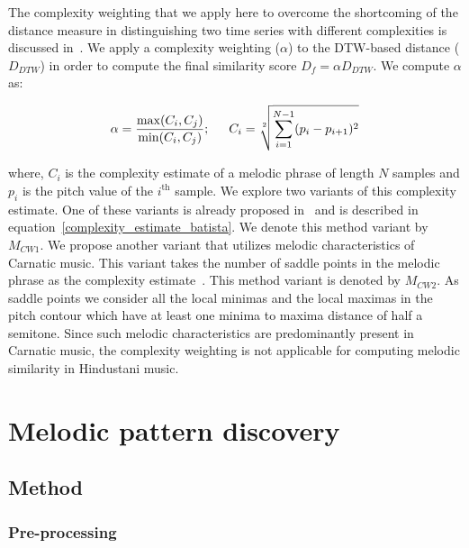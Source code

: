 The complexity weighting that we apply here to overcome the shortcoming of the distance measure in distinguishing two time series with different complexities is discussed in~\cite{batista2011complexity}. We apply a complexity weighting ($\alpha$) to the DTW-based distance ($D_{DTW}$) in order to compute the final similarity score $D_{f}=\alpha D_{DTW}$. We compute $\alpha$ as:


\begin{equation}
\begin{gathered}
\alpha = \frac{\max(C_i,C_j)}{\min(C_i, C_j)};\hspace{1.5em} C_i = \sqrt[2]{\sum_{i=1}^{N-1} (p_{i}-p_{i+1})^2}\\
\end{gathered}
\label{complexity_estimate_batista}
\end{equation}

\noindent where, $C_i$ is the complexity estimate of a melodic phrase of length $N$ samples and $p_i$ is the pitch value of the $i^{\mathrm{th}}$ sample. We explore two variants of this complexity estimate. One of these variants is already proposed in~\cite{batista2011complexity} and is described in equation~\ref{complexity_estimate_batista}. We denote this method variant by $M_{CW1}$. We propose another variant that utilizes melodic characteristics of Carnatic music. This variant takes the number of saddle points in the melodic phrase as the complexity estimate~\cite{Ishwar2013}. This method variant is denoted by $M_{CW2}$. As saddle points we consider all the local minimas and the local maximas in the pitch contour which have at least one minima to maxima distance of half a semitone. Since such melodic characteristics are predominantly present in Carnatic music, the complexity weighting is not applicable for computing melodic similarity in Hindustani music.


\section{Melodic pattern discovery}
\subsection{Method}


\subsubsection{Pre-processing}
\label{sec:preprocessing}

